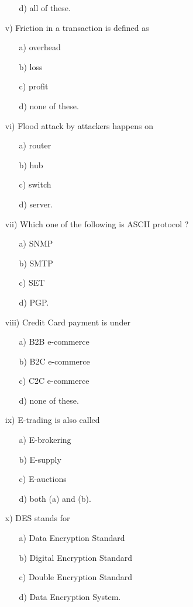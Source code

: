 \begin{enumerate}
\begin{enumerate}
        \item[d)] all of these.
    \end{enumerate}
    \item[v)] Friction in a transaction is defined as
    \begin{enumerate}
        \item[a)] overhead
        \item[b)] loss
        \item[c)] profit
        \item[d)] none of these.
    \end{enumerate}
    \item[vi)] Flood attack by attackers happens on
    \begin{enumerate}
        \item[a)] router
        \item[b)] hub
        \item[c)] switch
        \item[d)] server.
    \end{enumerate}
    \item[vii)] Which one of the following is ASCII protocol ?
    \begin{enumerate}
        \item[a)] SNMP
        \item[b)] SMTP
        \item[c)] SET
        \item[d)] PGP.
    \end{enumerate}
    \item[viii)] Credit Card payment is under
    \begin{enumerate}
        \item[a)] B2B e-commerce
        \item[b)] B2C e-commerce
        \item[c)] C2C e-commerce
        \item[d)] none of these.
    \end{enumerate}
    \item[ix)] E-trading is also called
    \begin{enumerate}
        \item[a)] E-brokering
        \item[b)] E-supply
        \item[c)] E-auctions
        \item[d)] both (a) and (b).
    \end{enumerate}
    \item[x)] DES stands for
    \begin{enumerate}
        \item[a)] Data Encryption Standard
        \item[b)] Digital Encryption Standard
        \item[c)] Double Encryption Standard
        \item[d)] Data Encryption System.
    \end{enumerate}
\end{enumerate}

